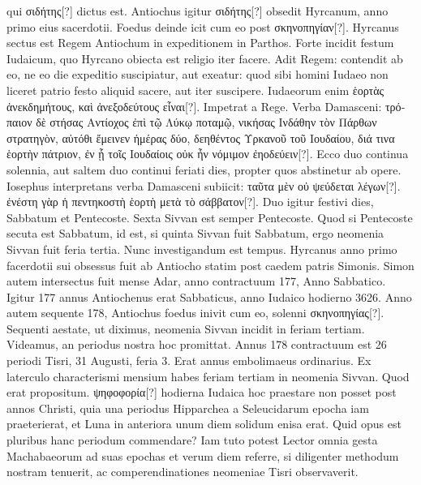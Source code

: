  qui \textgreek{σιδήτης[?]}
dictus est.
Antiochus igitur \textgreek{σιδήτης[?]} obsedit Hyrcanum, anno primo
eius sacerdotii.
Foedus deinde icit cum eo post \textgreek{σκηνοπηγίαν[?]}.
Hyrcanus
sectus est Regem Antiochum in expeditionem in Parthos.
Forte incidit
festum Iudaicum, quo Hyrcano obiecta est religio iter facere.
Adit Regem: contendit ab eo,
 ne eo die expeditio suscipiatur, aut exeatur:
quod sibi homini Iudaeo non liceret patrio festo aliquid sacere, aut
iter suscipere.
Iudaeorum enim \textgreek{ἑορτὰς ἀνεκδημήτους, καὶ ἀνεξοδεύτους εἶναι[?]}.
Impetrat a Rege.
Verba Damasceni: \textgreek{τρόπαιον δὲ στήσας Αντίοχος ἐπὶ τῷ
Λύκῳ ποταμῷ, νικήσας Ινδάθην τὸν Πάρθων στρατηγὸν, αὐτόθι ἔμεινεν ἡμέρας
δύο, δεηθέντος Υρκανοῦ τοῦ Ιουδαίου, διά τινα ἑορτὴν πάτριον, ἐν ᾗ τοῖς Ιουδαίοις
οὐκ ἦν νόμιμον ἐηοδεύειν[?]}.
Ecco duo continua solennia, aut saltem duo
continui feriati dies, propter quos abstinetur ab opere.
Iosephus interpretans
verba Damasceni subiicit: \textgreek{ταῦτα μὲν οὐ ψεύδεται λέγων[?]}.
%
\textgreek{ἐνέστη γὰρ
ἡ πεντηκοστὴ ἑορτὴ μετὰ τὸ σάββατον[?]}.
Duo igitur festivi dies, Sabbatum et
Pentecoste.
Sexta Sivvan est semper Pentecoste.
Quod si Pentecoste
secuta est Sabbatum, id est, si quinta Sivvan fuit Sabbatum, ergo neomenia
Sivvan fuit feria tertia.
Nunc investigandum est tempus. Hyrcanus
anno primo facerdotii sui obsessus fuit ab Antiocho statim post
caedem patris Simonis.
Simon autem intersectus fuit mense Adar, anno
contractuum 177, Anno Sabbatico.
Igitur 177 annus Antiochenus
erat Sabbaticus, anno Iudaico hodierno 3626.
Anno autem sequente
178, Antiochus foedus inivit cum eo, solenni \textgreek{σκηνοπηγίας[?]}.
Sequenti aestate, ut diximus, neomenia Sivvan incidit in feriam tertiam.
Videamus, an periodus nostra hoc promittat.
Annus 178 contractuum
est 26 periodi Tisri, 31 Augusti, feria 3.
Erat annus embolimaeus ordinarius.
Ex laterculo characterismi mensium habes feriam tertiam in
neomenia Sivvan.
Quod erat propositum.
\textgreek{ψηφοφορία[?]} hodierna Iudaica
hoc praestare non posset post annos Christi, quia una periodus Hipparchea
a Seleucidarum epocha iam praeterierat, et Luna in anteriora
unum diem solidum enisa erat.
Quid opus est pluribus hanc periodum
commendare?
Iam tuto potest Lector omnia gesta Machabaeorum
ad suas epochas et verum diem referre, si diligenter methodum
nostram tenuerit, ac comperendinationes neomeniae Tisri observaverit.
%
